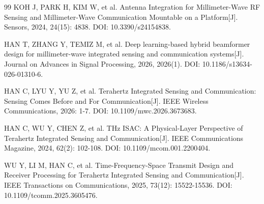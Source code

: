 \begin{thebibliography}{99}
 KOH J, PARK H, KIM W, et al. Antenna Integration for Millimeter-Wave RF Sensing and Millimeter-Wave Communication Mountable on a Platform[J]. Sensors, 2024, 24(15): 4838. DOI: 10.3390/s24154838.

 HAN T, ZHANG Y, TEMIZ M, et al. Deep learning-based hybrid beamformer design for millimeter-wave integrated sensing and communication systems[J]. Journal on Advances in Signal Processing, 2026, 2026(1). DOI: 10.1186/s13634-026-01310-6.

 HAN C, LYU Y, YU Z, et al. Terahertz Integrated Sensing and Communication: Sensing Comes Before and For Communication[J]. IEEE Wireless Communications, 2026: 1-7. DOI: 10.1109/mwc.2026.3673683.

 HAN C, WU Y, CHEN Z, et al. THz ISAC: A Physical-Layer Perspective of Terahertz Integrated Sensing and Communication[J]. IEEE Communications Magazine, 2024, 62(2): 102-108. DOI: 10.1109/mcom.001.2200404.

 WU Y, LI M, HAN C, et al. Time-Frequency-Space Transmit Design and Receiver Processing for Terahertz Integrated Sensing and Communication[J]. IEEE Transactions on Communications, 2025, 73(12): 15522-15536. DOI: 10.1109/tcomm.2025.3605476.

\end{thebibliography}